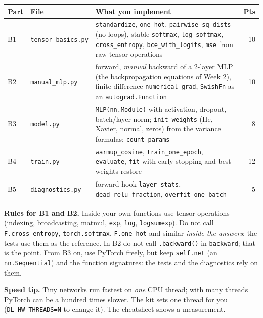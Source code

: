 \documentclass[11pt,a4paper]{article}
\begin{document}
\begin{center}
\small
\begin{tabularx}{\linewidth}{@{}l>{\raggedright\arraybackslash}p{2.9cm}X r@{}}
\toprule
\textbf{Part} & \textbf{File} & \textbf{What you implement} & \textbf{Pts}\\
\midrule
B1 & \texttt{tensor\_basics.py} & \texttt{standardize}, \texttt{one\_hot}, \texttt{pairwise\_sq\_dists} (no loops), stable \texttt{softmax}, \texttt{log\_softmax}, \texttt{cross\_entropy}, \texttt{bce\_with\_logits}, \texttt{mse} from raw tensor operations & 10\\
B2 & \texttt{manual\_mlp.py} & forward, \emph{manual} backward of a 2-layer MLP (the backpropagation equations of Week 2), finite-difference \texttt{numerical\_grad}, \texttt{SwishFn} as an \texttt{autograd.Function} & 10\\
B3 & \texttt{model.py} & \texttt{MLP(nn.Module)} with activation, dropout, batch/layer norm; \texttt{init\_weights} (He, Xavier, normal, zeros) from the variance formulas; \texttt{count\_params} & 8\\
B4 & \texttt{train.py} & \texttt{warmup\_cosine}, \texttt{train\_one\_epoch}, \texttt{evaluate}, \texttt{fit} with early stopping and best-weights restore & 12\\
B5 & \texttt{diagnostics.py} & forward-hook \texttt{layer\_stats}, \texttt{dead\_relu\_fraction}, \texttt{overfit\_one\_batch} & 5\\
\bottomrule
\end{tabularx}
\end{center}

\begin{notebox}
\textbf{Rules for B1 and B2.} Inside your own functions use tensor operations (indexing, broadcasting, matmul, \texttt{exp}, \texttt{log}, \texttt{logsumexp}). Do not call \texttt{F.cross\_entropy}, \texttt{torch.softmax}, \texttt{F.one\_hot}
and similar \emph{inside the answers}: the tests use them as the reference. In B2 do not call \texttt{.backward()} in \texttt{backward}; that is the point. From B3 on, use PyTorch freely, but keep \texttt{self.net} (an \texttt{nn.Sequential}) and the
function signatures: the tests and the diagnostics rely on them.
\end{notebox}

\begin{notebox}
\textbf{Speed tip.} Tiny networks run fastest on \emph{one} CPU thread; with many threads PyTorch can be a hundred times slower. The kit sets one thread for you (\texttt{DL\_HW\_THREADS=N} to change it). The cheatsheet shows a measurement.
\end{notebox}
\end{document}
